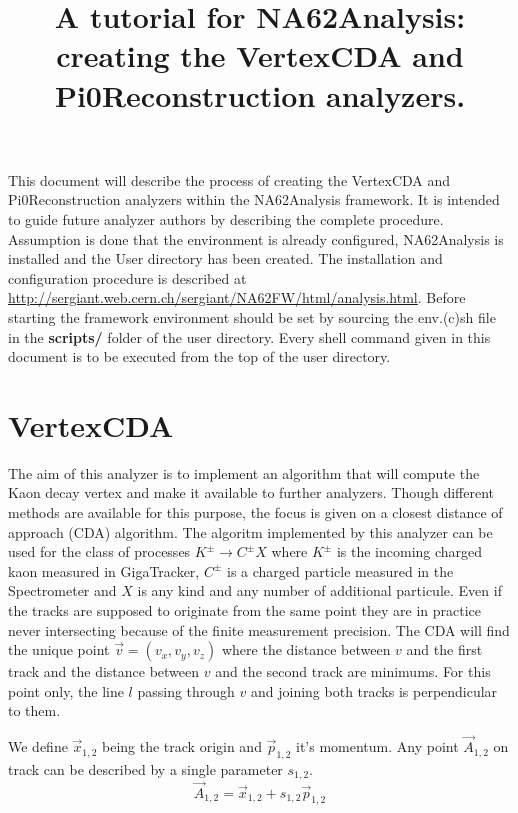 \documentclass{article}
\title{A tutorial for NA62Analysis: creating the VertexCDA and
Pi0Reconstruction analyzers.}
\renewcommand{\path}[1]{\textbf{#1}}
\begin{document}
\maketitle
\footnotesize
This document will describe the process of creating the VertexCDA and
Pi0Reconstruction analyzers within the NA62Analysis framework. It is intended to
guide future analyzer authors by describing the complete procedure. Assumption
is done that the environment is already configured, NA62Analysis is installed
and the User directory has been created. The installation and configuration
procedure is described at
\url{http://sergiant.web.cern.ch/sergiant/NA62FW/html/analysis.html}.
Before starting the framework environment should be set by sourcing the
env.(c)sh file in the \path{scripts/} folder of the user directory. Every shell command
given in this document is to be executed from the top of the user directory.

\section{VertexCDA}
The aim of this analyzer is to implement an algorithm that will compute the Kaon
decay vertex and make it available to further analyzers. Though different
methods are available for this purpose, the focus is given on a closest distance
of approach (CDA) algorithm. The algoritm implemented by this analyzer can be
used for the class of processes $K^\pm\to C^\pm X$ where $K^\pm$ is the
incoming charged kaon measured in GigaTracker, $C^\pm$ is a charged particle
measured in the Spectrometer and $X$ is any kind and any number of additional particule. Even if the
tracks are supposed to originate from the same point they are in practice never intersecting
because of the finite measurement precision. The CDA will find the unique point
$\vec{v}=(v_x,v_y,v_z)$ where the distance between $v$ and the first track and
the distance between $v$ and the second track are minimums. For this point only,
the line $l$ passing through $v$ and joining both tracks is perpendicular to them.

\newcommand{\p}[1]{\vec{p}_{#1}}
\newcommand{\ap}[1]{|\vec{p}_{#1}|^2}
\newcommand{\lv}{\vec{l}}
\newcommand{\lz}{\vec{l}_{0}}
\newcommand{\C}[1]{\vec{A}_{#1}}
\newcommand{\x}[1]{\vec{x}_{#1}}

We define $\vec{x}_{1,2}$ being the track origin and $\p{1,2}$ it's
momentum. Any point $\C{1,2}$ on track can be described by a
single parameter $s_{1,2}$.
\begin{equation}
	\C{1,2} = \x{1,2} + s_{1,2} \p{1,2}
\end{equation}
\end{document}
